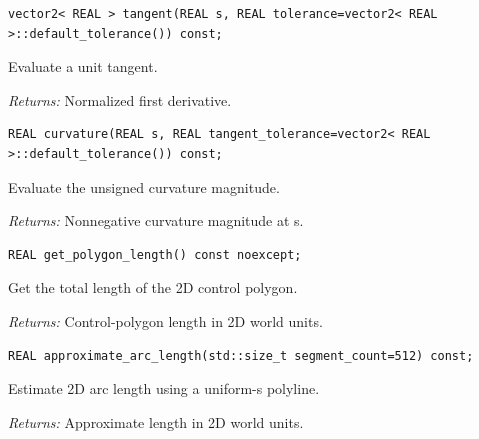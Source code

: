 \par\noindent\begin{minipage}{\linewidth}
\begin{lstlisting}[style=apireference]
vector2< REAL > tangent(REAL s, REAL tolerance=vector2< REAL >::default_tolerance()) const;
\end{lstlisting}
{\footnotesize Evaluate a unit tangent.\par}
{\footnotesize\textit{Returns:} Normalized first derivative.\par}
\end{minipage}\par\vspace{1pt}
\par\noindent\begin{minipage}{\linewidth}
\begin{lstlisting}[style=apireference]
REAL curvature(REAL s, REAL tangent_tolerance=vector2< REAL >::default_tolerance()) const;
\end{lstlisting}
{\footnotesize Evaluate the unsigned curvature magnitude.\par}
{\footnotesize\textit{Returns:} Nonnegative curvature magnitude at s.\par}
\end{minipage}\par\vspace{1pt}
\par\noindent\begin{minipage}{\linewidth}
\begin{lstlisting}[style=apireference]
REAL get_polygon_length() const noexcept;
\end{lstlisting}
{\footnotesize Get the total length of the 2D control polygon.\par}
{\footnotesize\textit{Returns:} Control-polygon length in 2D world units.\par}
\end{minipage}\par\vspace{1pt}
\par\noindent\begin{minipage}{\linewidth}
\begin{lstlisting}[style=apireference]
REAL approximate_arc_length(std::size_t segment_count=512) const;
\end{lstlisting}
{\footnotesize Estimate 2D arc length using a uniform-s polyline.\par}
{\footnotesize\textit{Returns:} Approximate length in 2D world units.\par}
\end{minipage}\par\vspace{1pt}

